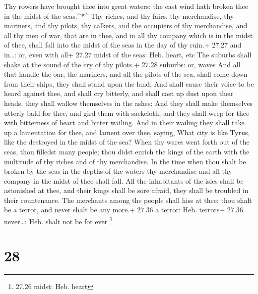  Thy rowers have brought thee into great waters: the east
wind hath broken thee in the midst of the seas.\^{}*\^{} 
Thy riches, and thy fairs, thy merchandise, thy mariners, and thy
pilots, thy calkers, and the occupiers of thy merchandise, and all thy
men of war, that are in thee, and in all thy company which is in the
midst of thee, shall fall into the midst of the seas in the day of thy
ruin.+ 27.27 and in\ldots: or, even with all+ 27.27 midst of the seas:
Heb. heart, etc  The suburbs shall shake at the sound of
the cry of thy pilots.+ 27.28 suburbs: or, waves  And all
that handle the oar, the mariners, and all the pilots of the sea, shall
come down from their ships, they shall stand upon the land;
 And shall cause their voice to be heard against thee, and
shall cry bitterly, and shall cast up dust upon their heads, they shall
wallow themselves in the ashes:  And they shall make
themselves utterly bald for thee, and gird them with sackcloth, and they
shall weep for thee with bitterness of heart and bitter wailing.
 And in their wailing they shall take up a lamentation for
thee, and lament over thee, saying, What city is like Tyrus, like the
destroyed in the midst of the sea?  When thy wares went
forth out of the seas, thou filledst many people; thou didst enrich the
kings of the earth with the multitude of thy riches and of thy
merchandise.  In the time when thou shalt be broken by the
seas in the depths of the waters thy merchandise and all thy company in
the midst of thee shall fall.  All the inhabitants of the
isles shall be astonished at thee, and their kings shall be sore afraid,
they shall be troubled in their countenance.  The merchants
among the people shall hiss at thee; thou shalt be a terror, and never
shalt be any more.+ 27.36 a terror: Heb. terrors+ 27.36 never\ldots:
Heb. shalt not be for ever \footnote{27.26 midst: Heb. heart}

\hypertarget{section-27}{%
\section{28}\label{section-27}}

